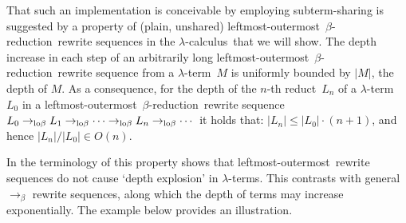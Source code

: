\documentclass[
submission
]{dmtcs-episciences-tampered}
\newcommand{\fap}[2]{#1({#2})}
\newcommand{\indap}[2]{#1 _{#2}}
\newcommand{\nb}{\nobreakdash}
\newcommand{\nf}{\normalfont}
\newcommand{\sbigOmicron}{O}
\newcommand{\bigOmicron}{\fap{\sbigOmicron}}
\newcommand{\sdepth}{\text{\nf d}}
\newcommand{\depth}[1]{\lvert{#1}\rvert} \newcommand{\depthbig}[1]{\big\lvert{#1}\big\rvert} \newcommand{\sudepth}{\indap{\sdepth}{\text{\nf u}}}
\newcommand{\alter}{M}
\newcommand{\clter}{L}
\newcommand{\clteri}{\indap{\clter}}
\newcommand{\sred}{\to}
\newcommand{\sredi}{\indap{\sred}}
\newcommand{\scriptlobeta}{\text{\nf lo}\beta}
\newcommand{\slobetared}{\sredi{\scriptlobeta}}
\newcommand{\lobetared}{\mathrel{\slobetared}}
\newcommand{\sbetared}{\sred_{\beta}}
\newcommand{\lambdacalculus}{$\lambda$\nb-cal\-cu\-lus}
\newcommand{\lambdaterm}{$\lambda$\nb-term}
\newcommand{\lambdaterms}{\lambdaterm{s}}
\newcommand{\betareduction}{$\beta$\nb-re\-duc\-tion}
\newcommand{\lo}{left\-most-outer\-most}
\theoremstyle{plain}
\theoremstyle{definition}
\begin{document}
That such an implementation is conceivable by employing subterm-sharing 
is suggested by a property of (plain, unshared) \lo\ \betareduction\ rewrite sequences in the \lambdacalculus\
that we will show.
The depth increase in each step of an arbitrarily long \lo\ \betareduction\ rewrite sequence from a \lambdaterm~$\alter$
is uniformly bounded by $\depth{\alter}$, the depth of $\alter$.
As a consequence, for the depth of the $n$\nb-th reduct~$\clteri{n}$ of a \lambdaterm~$\clteri{0}$ 
in a \lo\ \betareduction\ rewrite sequence $\clteri{0} \lobetared \clteri{1} \lobetared \cdots \lobetared \clteri{n} \lobetared \cdots$ 
it holds that: $\depth{\clteri{n}} \le \depth{\clteri{0}} \cdot (n+1)$,
and hence $\depth{\clteri{n}}/\depth{\clteri{0}} \in \bigOmicron{n}$. 

In the terminology of \cite{acca:lago:2014:beta-reduction-invariant:LICS,acca:lago:2016}
this property shows that \lo\ rewrite sequences do not cause `depth explosion' in \lambdaterms. 
This contrasts with general $\sbetared$ rewrite sequences,
along which the depth of terms may increase exponentially.
The example below provides an illustration. 
\end{document}
